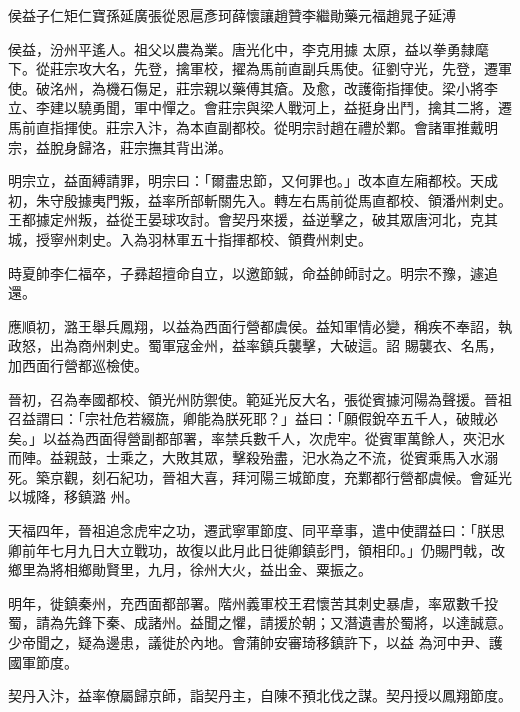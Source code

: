 
\begin{pinyinscope}

 侯益子仁矩仁寶孫延廣張從恩扈彥珂薛懷讓趙贊李繼勛藥元福趙晁子延溥



 侯益，汾州平遙人。祖父以農為業。唐光化中，李克用據
 太原，益以拳勇隸麾下。從莊宗攻大名，先登，擒軍校，擢為馬前直副兵馬使。征劉守光，先登，遷軍使。破洺州，為機石傷足，莊宗親以藥傅其瘡。及愈，改護衛指揮使。梁小將李立、李建以驍勇聞，軍中憚之。會莊宗與梁人戰河上，益挺身出鬥，擒其二將，遷馬前直指揮使。莊宗入汴，為本直副都校。從明宗討趙在禮於鄴。會諸軍推戴明宗，益脫身歸洛，莊宗撫其背出涕。



 明宗立，益面縛請罪，明宗曰：「爾盡忠節，又何罪也。」改本直左廂都校。天成
 初，朱守殷據夷門叛，益率所部斬關先入。轉左右馬前從馬直都校、領潘州刺史。王都據定州叛，益從王晏球攻討。會契丹來援，益逆擊之，破其眾唐河北，克其城，授寧州刺史。入為羽林軍五十指揮都校、領費州刺史。



 時夏帥李仁福卒，子彞超擅命自立，以邀節鋮，命益帥師討之。明宗不豫，遽追還。



 應順初，潞王舉兵鳳翔，以益為西面行營都虞侯。益知軍情必變，稱疾不奉詔，執政怒，出為商州刺史。蜀軍寇金州，益率鎮兵襲擊，大破這。詔
 賜襲衣、名馬，加西面行營都巡檢使。



 晉初，召為奉國都校、領光州防禦使。範延光反大名，張從賓據河陽為聲援。晉祖召益謂曰：「宗社危若綴旒，卿能為朕死耶？」益曰：「願假銳卒五千人，破賊必矣。」以益為西面得營副都部署，率禁兵數千人，次虎牢。從賓軍萬餘人，夾汜水而陣。益親鼓，士乘之，大敗其眾，擊殺殆盡，汜水為之不流，從賓乘馬入水溺死。築京觀，刻石紀功，晉祖大喜，拜河陽三城節度，充鄴都行營都虞候。會延光以城降，移鎮潞
 州。



 天福四年，晉祖追念虎牢之功，遷武寧軍節度、同平章事，遣中使謂益曰：「朕思卿前年七月九日大立戰功，故復以此月此日徙卿鎮彭門，領相印。」仍賜門戟，改鄉里為將相鄉勛賢里，九月，徐州大火，益出金、粟振之。



 明年，徙鎮秦州，充西面都部署。階州義軍校王君懷苦其刺史暴虐，率眾數千投蜀，請為先鋒下秦、成諸州。益聞之懼，請援於朝；又潛遺書於蜀將，以達誠意。少帝聞之，疑為邊患，議徙於內地。會蒲帥安審琦移鎮許下，以益
 為河中尹、護國軍節度。



 契丹入汴，益率僚屬歸京師，詣契丹主，自陳不預北伐之謀。契丹授以鳳翔節度。




\end{pinyinscope}
